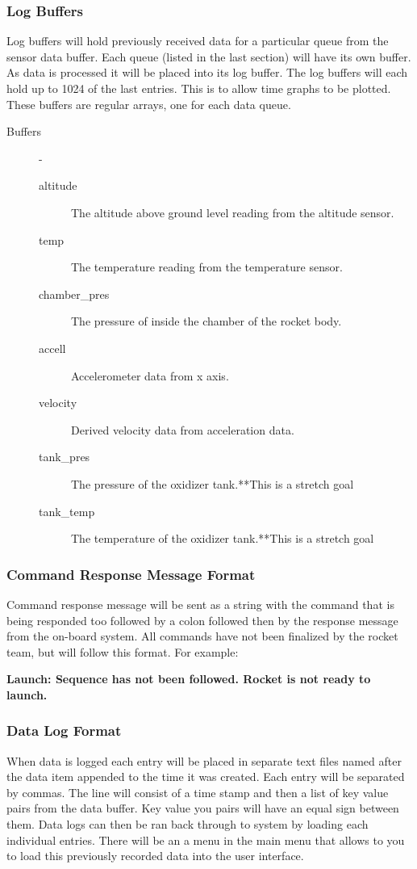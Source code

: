 \documentclass[10pt,draftclsnofoot,onecolumn,compsoc]{IEEEtran}
\begin{document}
\subsubsection{Log Buffers}
Log buffers will hold previously received data for a particular queue from the sensor data buffer. Each queue (listed in the last section) will have its own buffer. As data is processed it will be placed into its log buffer. The log buffers will each hold up to 1024 of the last entries. This is to allow time graphs to be plotted. These buffers are regular arrays, one for each data queue.
\begin{description}
	\item[Buffers]  -
		\begin{description}
			\item[altitude] The altitude above ground level reading from the altitude sensor.
			\item[temp] The temperature reading from the temperature sensor.
			\item[chamber\_pres] The pressure of inside the chamber of the rocket body.
			\item[accell] Accelerometer data from x axis.
			\item[velocity] Derived velocity data from acceleration data.
			\item[tank\_pres] The pressure of the oxidizer tank.**This is a stretch goal
			\item[tank\_temp] The temperature of the oxidizer tank.**This is a stretch goal
		\end{description}
\end{description}

\subsubsection{Command Response Message Format}
Command response message will be sent as a string with the command that is being responded too followed by a colon followed then by the response message from the on-board system. All commands have not been finalized by the rocket team, but will follow this format.  For example: \par
{\bf Launch: Sequence has not been followed. Rocket is not ready to launch. } \par

\subsubsection{Data Log Format}
When data is logged each entry will be placed in separate text files named after the data item appended to the time it was created. Each entry will be separated by commas. The line will consist of a time stamp and then a list of key value pairs from the data buffer. Key value you pairs will have an equal sign between them. Data logs can then be ran back through to system by loading each individual entries. There will be an a menu in the main menu that allows to you to load this previously recorded data into the user interface. \par
\end{document}
